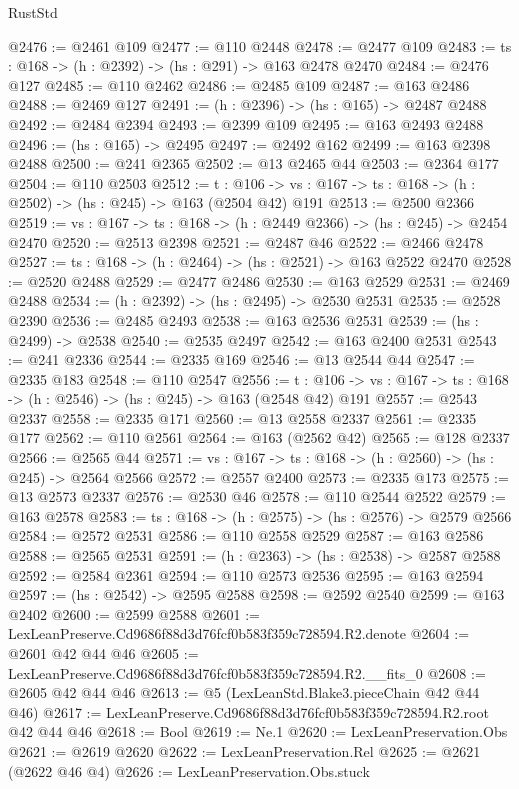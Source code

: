\begin{lexlean}{RustStd}
\begin{coremodule}
@2476 := @2461 @109
@2477 := @110 @2448
@2478 := @2477 @109
@2483 := {ts : @168} -> (h : @2392) -> (hs : @291) -> @163 @2478 @2470
@2484 := @2476 @127
@2485 := @110 @2462
@2486 := @2485 @109
@2487 := @163 @2486
@2488 := @2469 @127
@2491 := (h : @2396) -> (hs : @165) -> @2487 @2488
@2492 := @2484 @2394
@2493 := @2399 @109
@2495 := @163 @2493 @2488
@2496 := (hs : @165) -> @2495
@2497 := @2492 @162
@2499 := @163 @2398 @2488
@2500 := @241 @2365
@2502 := @13 @2465 @44
@2503 := @2364 @177
@2504 := @110 @2503
@2512 := {t : @106} ->
  {vs : @167} -> {ts : @168} -> (h : @2502) -> (hs : @245) -> @163 (@2504 @42) @191
@2513 := @2500 @2366
@2519 := {vs : @167} -> {ts : @168} -> (h : @2449 @2366) -> (hs : @245) -> @2454 @2470
@2520 := @2513 @2398
@2521 := @2487 @46
@2522 := @2466 @2478
@2527 := {ts : @168} -> (h : @2464) -> (hs : @2521) -> @163 @2522 @2470
@2528 := @2520 @2488
@2529 := @2477 @2486
@2530 := @163 @2529
@2531 := @2469 @2488
@2534 := (h : @2392) -> (hs : @2495) -> @2530 @2531
@2535 := @2528 @2390
@2536 := @2485 @2493
@2538 := @163 @2536 @2531
@2539 := (hs : @2499) -> @2538
@2540 := @2535 @2497
@2542 := @163 @2400 @2531
@2543 := @241 @2336
@2544 := @2335 @169
@2546 := @13 @2544 @44
@2547 := @2335 @183
@2548 := @110 @2547
@2556 := {t : @106} ->
  {vs : @167} -> {ts : @168} -> (h : @2546) -> (hs : @245) -> @163 (@2548 @42) @191
@2557 := @2543 @2337
@2558 := @2335 @171
@2560 := @13 @2558 @2337
@2561 := @2335 @177
@2562 := @110 @2561
@2564 := @163 (@2562 @42)
@2565 := @128 @2337
@2566 := @2565 @44
@2571 := {vs : @167} -> {ts : @168} -> (h : @2560) -> (hs : @245) -> @2564 @2566
@2572 := @2557 @2400
@2573 := @2335 @173
@2575 := @13 @2573 @2337
@2576 := @2530 @46
@2578 := @110 @2544 @2522
@2579 := @163 @2578
@2583 := {ts : @168} -> (h : @2575) -> (hs : @2576) -> @2579 @2566
@2584 := @2572 @2531
@2586 := @110 @2558 @2529
@2587 := @163 @2586
@2588 := @2565 @2531
@2591 := (h : @2363) -> (hs : @2538) -> @2587 @2588
@2592 := @2584 @2361
@2594 := @110 @2573 @2536
@2595 := @163 @2594
@2597 := (hs : @2542) -> @2595 @2588
@2598 := @2592 @2540
@2599 := @163 @2402
@2600 := @2599 @2588
@2601 := LexLeanPreserve.Cd9686f88d3d76fcf0b583f359c728594.R2.denote
@2604 := @2601 @42 @44 @46
@2605 := LexLeanPreserve.Cd9686f88d3d76fcf0b583f359c728594.R2.__fits_0
@2608 := @2605 @42 @44 @46
@2613 := @5 (LexLeanStd.Blake3.pieceChain @42 @44 @46)
@2617 := LexLeanPreserve.Cd9686f88d3d76fcf0b583f359c728594.R2.root @42 @44 @46
@2618 := Bool
@2619 := Ne.{1}
@2620 := LexLeanPreservation.Obs
@2621 := @2619 @2620
@2622 := LexLeanPreservation.Rel
@2625 := @2621 (@2622 @46 @4)
@2626 := LexLeanPreservation.Obs.stuck

\end{coremodule}
\end{lexlean}
